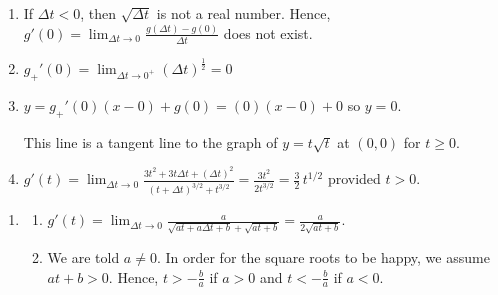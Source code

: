 \documentclass{ximera}
\begin{document}
\begin{enumerate}
\begin{enumerate}
\item  If $\Delta t < 0$, then $\sqrt{\Delta t}$ is not a real number.  Hence, $g'(0) = \lim_{\Delta t \rightarrow 0} \frac{g(\Delta t) - g(0)}{\Delta t}$ does not exist.

\item  $g_{+}'(0) =\lim_{\Delta t \rightarrow 0^{+}} (\Delta t)^{\frac{1}{2}}   =  0$

\smallskip

\item  $y = g_{+}'(0) (x - 0) + g(0) =  (0) (x-0) + 0$ so $y = 0$.  

\smallskip

This line is a tangent line to the graph of $y = t \sqrt{t}$ at $(0,0)$ for $t \geq 0$.

\smallskip

\item  $g'(t) =\lim_{\Delta t \rightarrow 0}\frac{3t^2+3t\Delta t+(\Delta t)^2}{(t+\Delta t)^{3/2} + t^{3/2}} = \frac{3t^2}{2 t^{3/2}} = \frac{3}{2} \, t^{1/2}$ provided $t > 0$.


\end{enumerate}


\setcounter{HW}{\value{enumi}}
\end{enumerate}

\begin{enumerate}
\setcounter{enumi}{\value{HW}}

\item  \begin{enumerate} \item  $g'(t) = \lim_{\Delta t \rightarrow 0} \frac{a}{\sqrt{at+a\Delta t+b} + \sqrt{at+b}} = \frac{a}{2 \sqrt{at+b}}$.  

\smallskip

\item  We are told $a \neq 0$.  In order for the square roots to be happy, we assume $at + b > 0$.  Hence,   $t >  - \frac{b}{a}$ if $a>0$ and $t < -  \frac{b}{a}$ if $a<0$. 

\end{enumerate}

\setcounter{HW}{\value{enumi}}
\end{enumerate}
\end{document}

